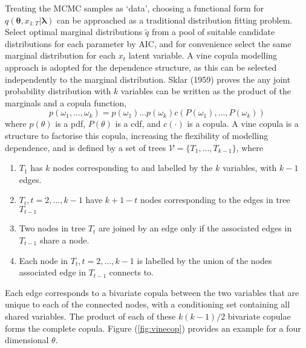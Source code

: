 \documentclass[12pt,a4paper]{article}%
\numberwithin{equation}{section}
\begin{document}
Treating the MCMC samples as `data', choosing a functional form for $q(\boldsymbol{\theta}, x_{1:T} | \boldsymbol{\lambda})$ can be approached as a traditional distribution fitting problem. Select optimal marginal distributions $\tilde{q}$ from a pool of suitable candidate distributions for each parameter by AIC, and for convenience select the same marginal distribution for each $x_t$ latent variable. A vine copula modelling approach is adopted for the dependence structure, as this can be selected independently to the marginal distribution. Sklar (1959) proves the any joint probability distribution with $k$ variables can be written as the product of the marginals and a copula function,
\begin{equation}
\label{vc1}
p(\omega_1, \dots, \omega_k) = p(\omega_1) \dots p(\omega_k) c(P(\omega_1), \dots, P(\omega_k))
\end{equation}
where $p(\theta)$ is a pdf, $P(\theta)$ is a cdf, and $c(\cdot)$ is a copula. A vine copula is a structure to factorise this copula, increasing the flexibility of modelling dependence, and is defined by a set of trees $\mathcal{V} = \{T_1, \dots, T_{k-1} \}$, where
\begin{enumerate}
\item $T_1$ has $k$ nodes corresponding to and labelled by the $k$ variables, with $k-1$ edges.
\item $T_t, t = 2, \dots, k-1$ have $k+1-t$ nodes corresponding to the edges in tree $T_{t-1}$
\item Two nodes in tree $T_t$ are joined by an edge only if the associated edges in $T_{t-1}$ share a node. 
\item Each node in $T_t,  t = 2, \dots, k-1$ is labelled by the union of the nodes associated edge in $T_{t-1}$ connects to.
\end{enumerate}
Each edge corresponds to a bivariate copula between the two variables that are unique to each of the connected nodes, with a conditioning set containing all shared variables. The product of each of these $k(k-1)/2$ bivariate copulae forms the complete copula. Figure (\ref{fig:vinecop}) provides an example for a four dimensional $\theta$.

\iffalse
\begin{figure}[h]
\centering
\texttt{[image: vines.png]}
\vspace{2mm}
\caption{An example of a Vine Copula over four variables. The edges in the top tree represent unconditional bivariate copulae between the parameters on the connected nodes. The second tree edges represent the bivariate copulae for $\theta_1 \theta_3 | \theta_2$ and for $\theta_3 \theta_4 | \theta_2$, the conditioning on $\theta_2$ caused by its appearance in each connected node. The edge in the final tree represents the bivariate copula for $\theta_1, \theta_4 | \theta_2, \theta_3$, as both $\theta_2$ and $\theta_3$ appear in the connected nodes.}
\label{fig:vinecop}
\end{figure}
\fi
\end{document}
